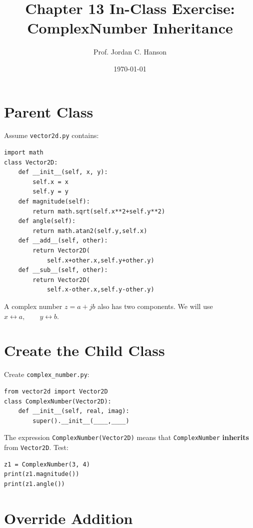 \documentclass[11pt]{article}
\begin{document}
\twocolumn

\title{Chapter 13 In-Class Exercise: ComplexNumber Inheritance}
\author{Prof. Jordan C. Hanson}
\date{\today}
\maketitle

\section{Parent Class}

Assume \texttt{vector2d.py} contains:

\begin{verbatim}
import math
class Vector2D:
    def __init__(self, x, y):
        self.x = x
        self.y = y
    def magnitude(self):
        return math.sqrt(self.x**2+self.y**2)
    def angle(self):
        return math.atan2(self.y,self.x)
    def __add__(self, other):
        return Vector2D(
            self.x+other.x,self.y+other.y)
    def __sub__(self, other):
        return Vector2D(
            self.x-other.x,self.y-other.y)
\end{verbatim}

A complex number \(z=a+jb\) also has two components. We will use $x\leftrightarrow a,\qquad y\leftrightarrow b$.

\section{Create the Child Class}

Create \texttt{complex\_number.py}:

\begin{verbatim}
from vector2d import Vector2D
class ComplexNumber(Vector2D):
    def __init__(self, real, imag):
        super().__init__(____,____)
\end{verbatim}

The expression \texttt{ComplexNumber(Vector2D)} means that
\texttt{ComplexNumber} \textbf{inherits} from \texttt{Vector2D}. Test:

\begin{verbatim}
z1 = ComplexNumber(3, 4)
print(z1.magnitude())
print(z1.angle())
\end{verbatim}

\section{Override Addition}
\end{document}
